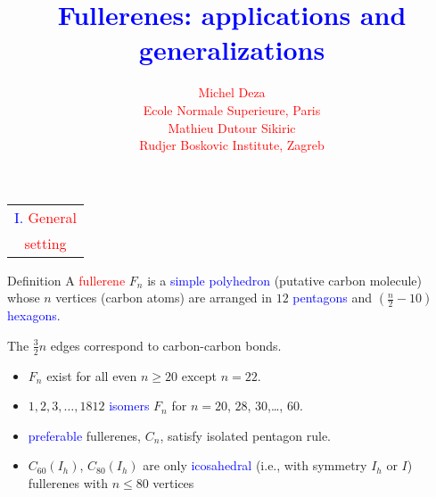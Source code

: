 \documentclass[%
pdf,
colorBG,
slideColor,
]{prosper}
\title{\Huge \textcolor{blue}{Fullerenes: applications and generalizations}}
\author{
\textcolor{red}{\Large Michel Deza}\\[2mm]
\textcolor{red}{\large Ecole Normale Superieure, Paris}\\[2mm]
\textcolor{red}{\Large Mathieu Dutour Sikiric}\\[2mm]
\textcolor{red}{\large Rudjer Boskovic Institute, Zagreb}
}
\date{}
\begin{document}
\maketitle








\begin{slide}{}
\begin{center}
{\Huge 
\begin{tabular*}{5cm}{c}
\\[-0.5cm]
\textcolor{blue}{I. }\textcolor{red}{General}\\
\textcolor{red}{setting}
\end{tabular*}
}
\end{center}
\end{slide}



\begin{slide}{Definition}
A \textcolor{red}{fullerene} $F_n$ is a \textcolor{blue}{simple polyhedron} (putative carbon molecule) whose $n$ vertices (carbon atoms) are arranged in $12$ \textcolor{blue}{pentagons} and $(\frac{n}{2}-10)$ \textcolor{blue}{hexagons}.

The $\frac{3}{2}n$ edges correspond to carbon-carbon bonds.
\begin{itemize}
\item $F_n$ exist for all even $n\geq 20$ except $n=22$.
\item $1,2,3,\dots,1812$ \textcolor{blue}{isomers} $F_n$ for $n=20$, $28$, $30$,\dots, $60$.
\item \textcolor{blue}{preferable} fullerenes, $C_n$, satisfy isolated pentagon rule.
\item $C_{60}(I_h)$, $C_{80}(I_h)$ are only \textcolor{blue}{icosahedral}
(i.e., with symmetry $I_h$ or $I$) fullerenes with $n \le 80$ vertices
\end{itemize}
\end{slide}
\end{document}
